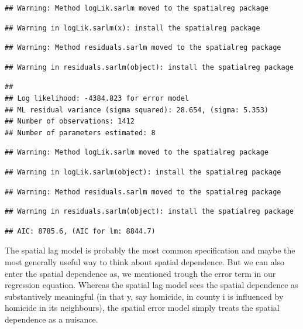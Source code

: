 \documentclass[]{book}
\begin{document}
\begin{verbatim}
## Warning: Method logLik.sarlm moved to the spatialreg package
\end{verbatim}

\begin{verbatim}
## Warning in logLik.sarlm(x): install the spatialreg package
\end{verbatim}

\begin{verbatim}
## Warning: Method residuals.sarlm moved to the spatialreg package
\end{verbatim}

\begin{verbatim}
## Warning in residuals.sarlm(object): install the spatialreg package
\end{verbatim}

\begin{verbatim}
## 
## Log likelihood: -4384.823 for error model
## ML residual variance (sigma squared): 28.654, (sigma: 5.353)
## Number of observations: 1412 
## Number of parameters estimated: 8
\end{verbatim}

\begin{verbatim}
## Warning: Method logLik.sarlm moved to the spatialreg package
\end{verbatim}

\begin{verbatim}
## Warning in logLik.sarlm(object): install the spatialreg package
\end{verbatim}

\begin{verbatim}
## Warning: Method residuals.sarlm moved to the spatialreg package
\end{verbatim}

\begin{verbatim}
## Warning in residuals.sarlm(object): install the spatialreg package
\end{verbatim}

\begin{verbatim}
## AIC: 8785.6, (AIC for lm: 8844.7)
\end{verbatim}

The spatial lag model is probably the most common specification and maybe the most generally useful way to think about spatial dependence. But we can also enter the spatial dependence as, we mentioned trough the error term in our regression equation. Whereas the spatial lag model sees the spatial dependence as substantively meaningful (in that y, say homicide, in county i is influenced by homicide in its neighbours), the spatial error model simply treats the spatial dependence as a nuisance.
\end{document}
